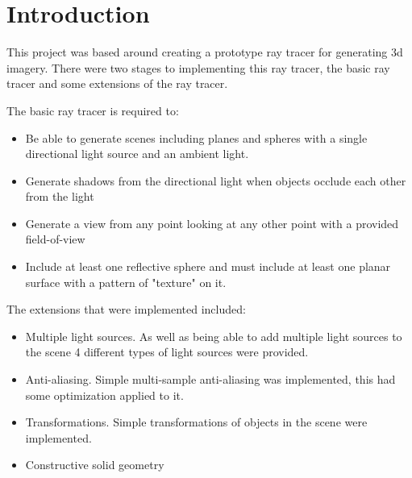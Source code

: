 \chapter{Introduction}
  This project was based around creating a prototype ray tracer for generating
  3d imagery.  There were two stages to implementing this ray tracer, the basic
  ray tracer and some extensions of the ray tracer.
  
  The basic ray tracer is
  required to:
  \begin{itemize}
    \item Be able to generate scenes including planes and spheres with a
      single directional light source and an ambient light.
    \item Generate shadows from the directional light when objects occlude each
      other from the light
    \item Generate a view from any point looking at any other point with a
      provided field-of-view
    \item Include at least one reflective sphere and must include at least one
      planar surface with a pattern of "texture" on it.
  \end{itemize}

  The extensions that were implemented included:
  \begin{itemize}
    \item Multiple light sources.  As well as being able to add multiple light
      sources to the scene 4 different types of light sources were provided.
    \item Anti-aliasing. Simple multi-sample anti-aliasing was implemented, this
      had some optimization applied to it.
    \item Transformations. Simple transformations of objects in the scene were
      implemented.
    \item Constructive solid geometry
  \end{itemize}
  
    

